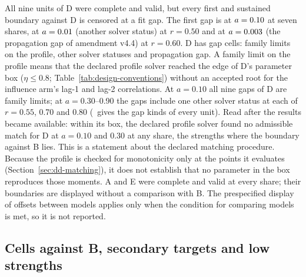 All nine units of D were complete and valid, but every first and sustained boundary against D is censored at a fit gap. The first gap is at $a=\resultnum{j.models.D.r055.first_gap}{0.10}$ at seven shares, at $a=\resultnum{j.models.D.r050.first_gap}{0.01}$ (another solver status) at $r=0.50$ and at $a=\resultnum{j.models.D.r060.first_gap}{0.003}$ (the propagation gap of amendment v4.4) at $r=0.60$. D has  gap cells:  family limits on the profile,  other solver statuses and  propagation gap. A family limit on the profile means that the declared profile solver reached the edge of D's parameter box ($\eta\le0.8$; Table~\ref{tab:design-conventions}) without an accepted root for the influence arm's lag-1 and lag-2 correlations. At $a=0.10$ all nine gaps of D are family limits; at $a=0.30$--0.90 the gaps include one other solver status at each of $r=0.55$, 0.70 and 0.80 (\allunitsresource\ gives the gap kinds of every unit). Read after the results became available: within its box, the declared profile solver found no admissible match for D at $a=0.10$ and 0.30 at any share, the strengths where the boundary against B lies. This is a statement about the declared matching procedure. Because the profile is checked for monotonicity only at the points it evaluates (Section~\ref{sec:dd-matching}), it does not establish that no parameter in the box reproduces those moments.
A and E were complete and valid at every share; their boundaries are displayed without a comparison with B.
The prespecified display of offsets between models applies only when the condition for comparing models is met, so it is not reported.







\subsection{Cells against B, secondary targets and low strengths}\label{sec:additional-b}

